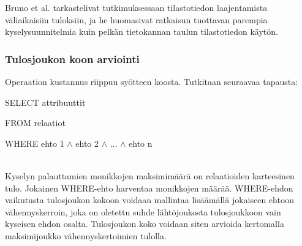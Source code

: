 \documentclass[finnish]{tktltiki2}
\theoremstyle{definition}
\theoremstyle{remark}
\begin{document}
Bruno et al. tarkastelivat tutkimuksessaan \cite{bruno2002exploiting} tilastotiedon laajentamista väliaikaisiin tuloksiin, ja he huomasivat ratkaisun tuottavan parempia kyselysuunnitelmia kuin pelkän tietokannan taulun tilastotiedon käytön.

\subsubsection{Tulosjoukon koon arviointi}
Operaation kustannus riippuu syötteen koosta. Tutkitaan seuraavaa tapausta:
\newline

\begin{frame}

SELECT attribuuttit

FROM relaatiot

WHERE ehto 1 $\wedge$ ehto 2 $\wedge$ ... $\wedge$ ehto n
\end{frame}
\\\newline
Kyselyn palauttamien monikkojen maksimimäärä on relaatioiden karteesinen tulo. Jokainen WHERE-ehto harventaa monikkojen määrää. WHERE-ehdon vaikutusta tulosjoukon kokoon voidaan mallintaa lisäämällä jokaiseen ehtoon vähennyskerroin, joka on oletettu suhde lähtöjoukosta tulosjoukkoon vain kyseisen ehdon osalta. 
Tulosjoukon koko voidaan siten arvioida kertomalla maksimijoukko vähennyskertoimien tulolla. \cite{ramakrishnan2003database}
\end{document}
